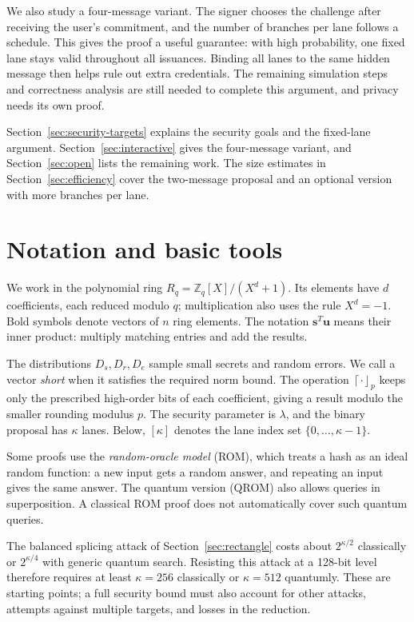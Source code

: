 \documentclass[10pt]{article}
\newcommand{\R}{R_q}
\newcommand{\roundp}[1]{\left\lceil #1\right\rfloor_p}
\begin{document}
We also study a four-message variant.  The signer chooses the challenge
after receiving the user's commitment, and the number of branches per lane
follows a schedule.  This gives the proof a useful guarantee: with high
probability, one fixed lane stays valid throughout all issuances.  Binding
all lanes to the same hidden message then helps rule out extra credentials.
The remaining simulation steps and correctness analysis are still needed to
complete this argument, and privacy needs its own proof.

Section~\ref{sec:security-targets} explains the security goals and the
fixed-lane argument.  Section~\ref{sec:interactive} gives the four-message
variant, and Section~\ref{sec:open} lists the remaining work.  The size
estimates in Section~\ref{sec:efficiency} cover the two-message proposal and
an optional version with more branches per lane.

\section{Notation and basic tools}

We work in the polynomial ring $\R=\mathbb Z_q[X]/(X^d+1)$.  Its elements
have $d$ coefficients, each reduced modulo $q$; multiplication also uses the
rule $X^d=-1$.  Bold symbols denote vectors of $n$ ring elements.  The
notation $\mathbf s^T\mathbf u$ means their inner product: multiply matching
entries and add the results.

The distributions $D_s,D_r,D_e$ sample small secrets and random errors.
We call a vector \emph{short} when it satisfies the required norm bound.
The operation $\roundp{\cdot}$ keeps only the prescribed high-order bits of
each coefficient, giving a result modulo the smaller rounding modulus $p$.
The security parameter is $\lambda$, and the binary proposal has $\kappa$
lanes.  Below, $[\kappa]$ denotes the lane index set
$\{0,\ldots,\kappa-1\}$.

Some proofs use the \emph{random-oracle model} (ROM), which treats a hash as
an ideal random function: a new input gets a random answer, and repeating an
input gives the same answer.  The quantum version (QROM) also allows queries
in superposition.  A classical ROM proof does not automatically cover such
quantum queries.

The balanced splicing attack of Section~\ref{sec:rectangle} costs about
$2^{\kappa/2}$ classically or $2^{\kappa/4}$ with generic quantum search.
Resisting this attack at a 128-bit level therefore requires at least
$\kappa=256$ classically or $\kappa=512$ quantumly.  These are starting
points; a full security bound must also account for other attacks, attempts
against multiple targets, and losses in the reduction.
\end{document}
